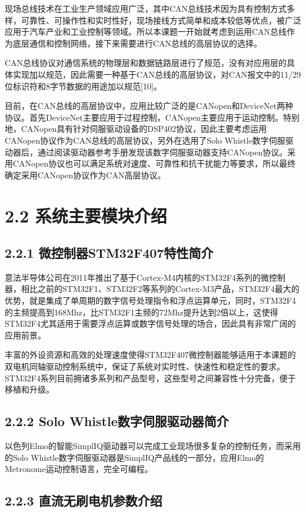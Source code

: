 \documentclass[UTF8,zihao=-4,openany,oneside]{ctexbook}
\begin{document}
现场总线技术在工业生产领域应用广泛，其中CAN总线技术因为具有控制方式多样，可靠性、可操作性和实时性好，现场接线方式简单和成本较低等优点，被广泛应用于汽车产业和工业控制等领域。所以本课题一开始就考虑到运用CAN总线作为底层通信和控制网络，接下来需要进行CAN总线的高层协议的选择。

CAN总线协议对通信系统的物理层和数据链路层进行了规范，没有对应用层的具体实现加以规范，因此需要一种基于CAN总线的高层协议，对CAN报文中的11/29位标识符和8字节数据的用途加以规范[10]。

目前，在CAN总线的高层协议中，应用比较广泛的是CANopen和DeviceNet两种协议。首先DeviceNet主要应用于过程控制，CANopen主要应用于运动控制。特别地，CANopen具有针对伺服驱动设备的DSP402协议，因此主要考虑运用CANopen协议作为CAN总线的高层协议，另外在选用了Solo Whistle数字伺服驱动器后，通过阅读驱动器参考手册发现该数字伺服驱动器支持CANopen协议。采用CANopen协议也可以满足系统对速度、可靠性和抗干扰能力等要求，所以最终确定采用CANopen协议作为CAN高层协议。

\section{2.2 系统主要模块介绍}

\subsection{2.2.1 微控制器STM32F407特性简介}

意法半导体公司在2011年推出了基于Cortex-M4内核的STM32F4系列的微控制器，相比之前的STM32F1、STM32F2等系列的Cortex-M3产品，STM32F4最大的优势，就是集成了单周期的数字信号处理指令和浮点运算单元，同时，STM32F4的主频提高到168Mhz，比STM32F1主频的72Mhz提升达到2倍以上，这使得STM32F4尤其适用于需要浮点运算或数字信号处理的场合，因此具有非常广阔的应用前景。

丰富的外设资源和高效的处理速度使得STM32F407微控制器能够适用于本课题的双电机同轴驱动控制系统中，保证了系统对实时性、快速性和稳定性的要求。STM32F4系列目前拥诸多系列和产品型号，这些型号之间兼容性十分完备，便于移植和升级。

\subsection{2.2.2 Solo Whistle数字伺服驱动器简介}

以色列Elmo的智能SimplIQ驱动器可以完成工业现场很多复杂的控制任务，而采用的Solo Whistle数字伺服驱动器是SimplIQ产品线的一部分，应用Elmo的Metronome运动控制语言，完全可编程。

\subsection{2.2.3 直流无刷电机参数介绍}
\end{document}
